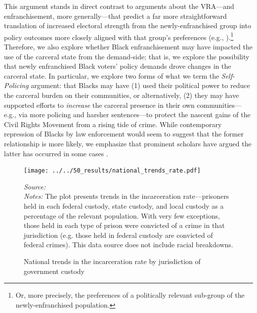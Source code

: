 \documentclass[12pt]{article}
\begin{document}
This argument stands in direct contrast to arguments about the VRA---and enfranchisement, more generally---that predict a far more straightforward translation of increased electoral strength from the newly-enfranchised group into policy outcomes more closely aligned with that group's preferences (e.g., \cite{Downs:1957vg}).\footnote{Or, more precisely, the preferences of a politically relevant sub-group of the newly-enfranchised population.}  Therefore, we also explore whether Black enfranchisement may have impacted the use of the carceral state from the demand-side; that is, we explore the possibility that newly enfranchised Black voters' policy demands drove changes in the carceral state. In particular, we explore two forms of what we term the \emph{Self-Policing} argument: that Blacks may have (1) used their political power to reduce the carceral burden on their communities, or alternatively, (2) they may have supported efforts to \emph{increase} the carceral presence in their own communities---e.g., via more policing and harsher sentences---to protect the nascent gains of the Civil Rights Movement from a rising tide of crime.  While contemporary repression of Blacks by law enforcement would seem to suggest that the former relationship is more likely, we emphasize that prominent scholars have argued the latter has occurred in some cases \citep{Fortner:2015uz,FormanJr:2017tz,Clegg:2018uq}.




\begin{figure}[t!]
	\begin{center}
	\caption{National trends in the incarceration rate by jurisdiction of government custody}
		\small \vspace*{.05in}
		\smallskip
				\texttt{[image: ../../50\_results/national\_trends\_rate.pdf]}
		\label{figure_national_trends}
		\end{center}
    \scriptsize{\emph{Source:} \cite{Stateprisonslocal:2016ua} } \\
	\scriptsize{\emph{Notes:} The plot presents trends in the incarceration rate---prisoners held in each federal custody, state custody, and local custody as a percentage of the relevant population. With very few exceptions, those held in each type of prison were convicted of a crime in that jurisdiction (e.g. those held in federal custody are convicted of federal crimes). This data source does not include racial breakdowns. }
\end{figure} \normalsize
\end{document}
